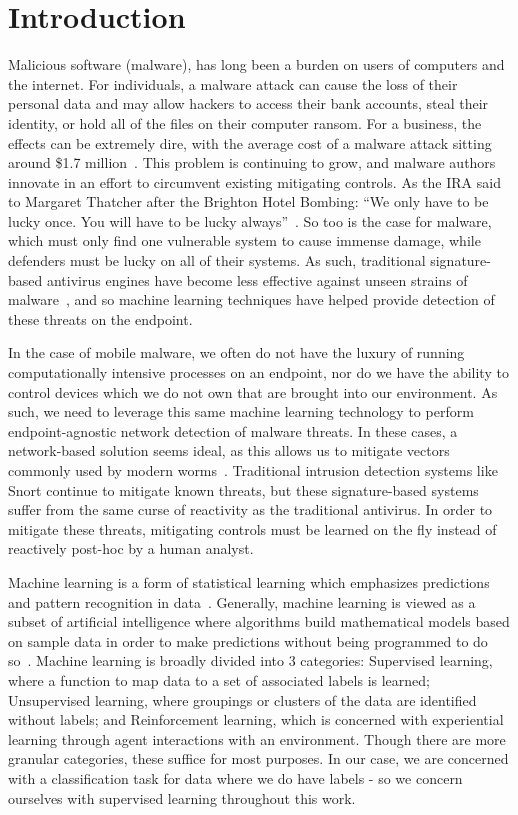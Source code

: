 \chapter{Introduction}
\label{chap:intro}

Malicious software (malware), has long been a burden on users of computers and the internet. 
For individuals, a malware attack can cause the loss of their personal data and may allow hackers to access their bank accounts, steal their identity, or hold all of the files on their computer ransom. 
For a business, the effects can be extremely dire, with the average cost of a malware attack sitting around \$1.7 million~\cite{seals2019threatlist}. 
This problem is continuing to grow, and malware authors innovate in an effort to circumvent existing mitigating controls. 
As the IRA said to Margaret Thatcher after the Brighton Hotel Bombing: ``We only have to be lucky once. You will have to be lucky always''~\cite{thomas1984this}. 
So too is the case for malware, which must only find one vulnerable system to cause immense damage, while defenders must be lucky on all of their systems. 
As such, traditional signature-based antivirus engines have become less effective against unseen strains of malware~\cite{oconnor2017how}, and so machine learning techniques have helped provide detection of these threats on the endpoint.

In the case of mobile malware, we often do not have the luxury of running computationally intensive processes on an endpoint, nor do we have the ability to control devices which we do not own that are brought into our environment. 
As such, we need to leverage this same machine learning technology to perform endpoint-agnostic network detection of malware threats. 
In these cases, a network-based solution seems ideal, as this allows us to mitigate vectors commonly used by modern worms~\cite{mohurle2017brief}. 
Traditional intrusion detection systems like Snort continue to mitigate known threats, but these signature-based systems suffer from the same curse of reactivity as the traditional antivirus. 
In order to mitigate these threats, mitigating controls must be learned on the fly instead of reactively post-hoc by a human analyst.

Machine learning is a form of statistical learning which emphasizes predictions and pattern recognition in data~\cite{james14introduction}.
Generally, machine learning is viewed as a subset of artificial intelligence where algorithms build mathematical models based on sample data in order to make predictions without being programmed to do so~\cite{bishop2006pattern}.
Machine learning is broadly divided into 3 categories: 
Supervised learning, where a function to map data to a set of associated labels is learned;
Unsupervised learning, where groupings or clusters of the data are identified without labels;
and Reinforcement learning, which is concerned with experiential learning through agent interactions with an environment.
Though there are more granular categories, these suffice for most purposes.
In our case, we are concerned with a classification task for data where we do have labels - so we concern ourselves with supervised learning throughout this work. 

